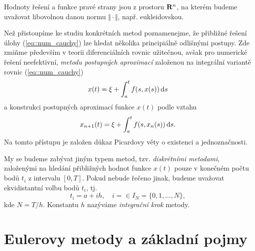 \documentclass[a4paper, 12pt]{book}
\theoremstyle{definition}
\def\Real{{\rm\bf R}}
\def\d{\,{\rm d}}               %
\def\norm#1{\bigl\Vert#1\bigr\Vert} %
\begin{document}
Hodnoty řešení a funkce pravé strany jsou z prostoru $\Real^n$, na kterém budeme uvažovat libovolnou danou normu $\norm{\cdot}$, např. eukleidovskou.

Než přistoupíme ke studiu konkrétních metod poznamenejme, 
že přibližné řešení úlohy (\ref{eq::num_cauchy}) lze hledat několika principiálně
odlišnými postupy. Zde zmiňme především v teorii diferenciálních rovnic 
užitečnou, avšak pro numerické řešení neefektivní, {\em metodu postupných
aproximací} založenou na integrální variantě rovnic (\ref{eq::num_cauchy})
\begin{displaymath}
x(t)=\xi + \int_a^t f(s,x(s))\d s
\end{displaymath}
a konstrukci postupných aproximací funkce $x(t)$ podle vztahu
\begin{displaymath}
x_{n+1}(t)=\xi + \int_a^t f(s,x_n(s))\d s.
\end{displaymath}
Na tomto přístupu je založen důkaz Picardovy věty o existenci a jednoznačnosti.

My se budeme zabývat jiným typem metod, tzv. {\em diskrétními 
metodami}, založenými na hledání přibližných hodnot funkce $x(t)$ pouze
v konečném počtu bodů $t_i$ z intervalu $[ 0,T ]$. 
Pokud nebude řečeno jinak, budeme uvažovat ekvidistantní volbu bodů $t_i$, tj.
\begin{displaymath}
t_i=a+ih,\quad i=\in I_N=\{0,1,\dots, N\},
\end{displaymath}
kde $N=T/h$.
Konstantu $h$ nazýváme {\em integrační krok} metody.


\section{Eulerovy metody a základní pojmy}
\end{document}
